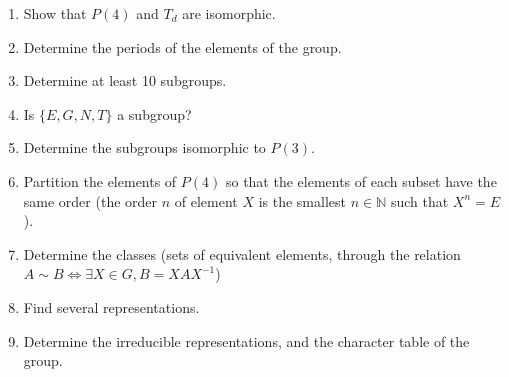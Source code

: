 \begin{enumerate}[label=(\roman*)]
\item Show that $P(4)$ and $T_d$ are isomorphic.
\item Determine the periods of the elements of the group.
\item Determine at least 10 subgroups.
\item Is $\{ E, G, N, T \}$ a subgroup?
\item Determine the subgroups isomorphic to $P(3)$.
\item Partition the elements of $P(4)$ so that the elements of each
  subset have the same order (the order $n$ of element $X$ is the smallest $n \in
  \mathbb{N}$ such that $X^n=E$).
\item Determine the classes (sets of equivalent elements, through the
  relation $A \sim B \Leftrightarrow \exists X \in G, B = XAX^{-1}$)
\item Find several representations.
\item Determine the irreducible representations, and the character
  table of the group.
\end{enumerate}

